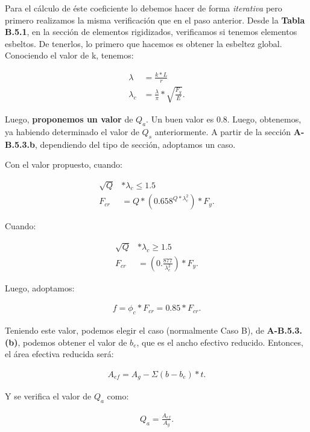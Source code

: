 \documentclass[../main.tex]{subfiles}
\begin{document}
Para el cálculo de éste coeficiente lo debemos hacer de forma \textit{iterativa}
pero primero realizamos la misma verificación que en el paso anterior. Desde la
\textbf{Tabla B.5.1}, en la sección de elementos rigidizados, verificamos si
tenemos elementos esbeltos. De tenerlos, lo primero que hacemos es obtener la 
esbeltez global. Conociendo el valor de k, tenemos:

\begin{align*}
  \lambda &= \frac{k*L}{r} \\[5pt]
  \lambda_c &= \frac{\lambda}{\pi}*\sqrt{\frac{F_y}{E}} 
.\end{align*}

Luego, \textbf{proponemos un valor} de $Q_a$. Un buen valor es 0.8. Luego,
obtenemos, ya habiendo determinado el valor de $Q_s$ anteriormente.
A partir de la sección \textbf{A-B.5.3.b}, dependiendo del tipo de sección,
adoptamos un caso.

Con el valor propuesto, cuando:

\begin{align*}
  \sqrt{Q} &* \lambda_c  \leq 1.5 \\[5pt]
  F_{cr} &= Q*\left( 0.658^{Q*\lambda_c^2} \right)*F_y \tag{A-B.5.15}
.\end{align*}

Cuando:

\begin{align*}
  \sqrt{Q} &* \lambda_c  \geq 1.5 \\[5pt]
  F_{cr} &= \left( 0.\frac{877}{\lambda_c^2} \right) * F_y \tag{A-B.5.16}
.\end{align*}

Luego, adoptamos:

\begin{align*}
  f = \phi_c * F_{cr} = 0.85 * F_{cr}
.\end{align*}

Teniendo este valor, podemos elegir el caso (normalmente Caso B), de 
\textbf{A-B.5.3.(b)}, podemos obtener el valor de $b_e$, que es el ancho
efectivo reducido. Entonces, el área efectiva reducida será:

\begin{align*}
  A_{ef} = A_{g} - \Sigma (b-b_e)*t
.\end{align*}
 
Y se verifica el valor de $Q_a$ como:

 \begin{align*}
   Q_a = \frac{A_{ef}}{A_g}
.\end{align*}
\end{document}
